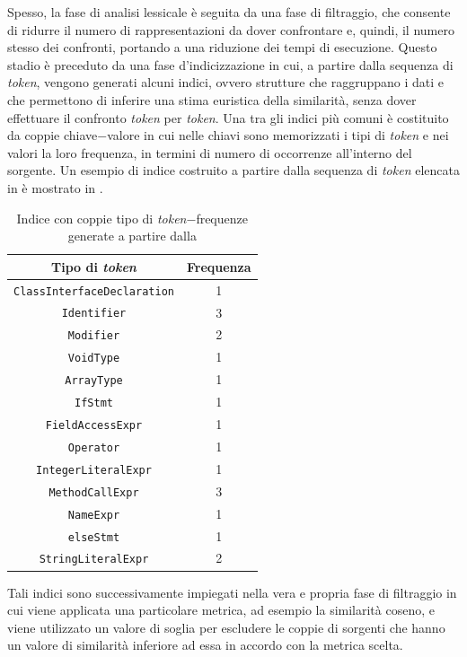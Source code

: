 Spesso, la fase di analisi lessicale è seguita da una fase di filtraggio, che consente di ridurre il numero di rappresentazioni da dover confrontare e, quindi, il numero stesso dei confronti, portando a una riduzione dei tempi di esecuzione.
%
Questo stadio è preceduto da una fase d'indicizzazione in cui, a partire dalla sequenza di \textit{token}, vengono generati alcuni indici, ovvero strutture che raggruppano i dati e che permettono di inferire una stima euristica della similarità, senza dover effettuare il confronto \textit{token} per \textit{token}.
%
Una tra gli indici più comuni è costituito da coppie chiave$-$valore in cui nelle chiavi sono memorizzati i tipi di \textit{token} e nei valori la loro frequenza, in termini di numero di occorrenze all'interno del sorgente.
%
Un esempio di indice costruito a partire dalla sequenza di \textit{token} elencata in  è mostrato in .
%
\begin{table}[h!]
    \centering
    \begin{tabular}{|c|c|} 
        \hline
        \textbf{Tipo di \textit{token}} & \textbf{Frequenza} \\ [0.5ex] 
        \hline\hline
        \texttt{ClassInterfaceDeclaration}  & 1 \\ \hline
        \texttt{Identifier}                 & 3 \\ \hline
        \texttt{Modifier}                   & 2 \\ \hline
        \texttt{VoidType}                   & 1 \\ \hline
        \texttt{ArrayType}                  & 1 \\ \hline
        \texttt{IfStmt}                     & 1 \\ \hline
        \texttt{FieldAccessExpr}            & 1 \\ \hline
        \texttt{Operator}                   & 1 \\ \hline
        \texttt{IntegerLiteralExpr}         & 1 \\ \hline
        \texttt{MethodCallExpr}             & 3 \\ \hline
        \texttt{NameExpr}                   & 1 \\ \hline
        \texttt{elseStmt}                   & 1 \\ \hline
        \texttt{StringLiteralExpr}          & 2 \\ \hline
    \end{tabular}
    \caption{Indice con coppie tipo di \textit{token}$-$frequenze generate a partire dalla }
    \label{table:token-indexing}
\end{table}
%
Tali indici sono successivamente impiegati nella vera e propria fase di filtraggio in cui viene applicata una particolare metrica, ad esempio la similarità coseno, e viene utilizzato un valore di soglia per escludere le coppie di sorgenti che hanno un valore di similarità inferiore ad essa in accordo con la metrica scelta.

